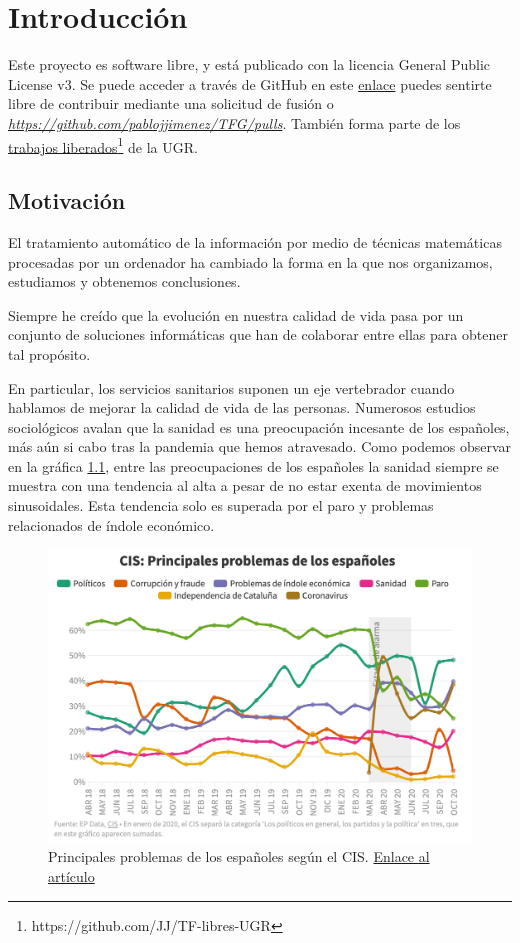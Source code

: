 \chapter{Introducción}
Este proyecto es software libre, y está publicado con la licencia \cite{gplv3} General Public License v3.
Se puede acceder a través de GitHub en este \href{https://github.com/pablojjimenez/TFG}{enlace} puedes sentirte libre de contribuir mediante una solicitud de fusión o \textit{\href{Pull Request}{https://github.com/pablojjimenez/TFG/pulls}}. También forma parte de los \href{https://github.com/JJ/TF-libres-UGR}{trabajos liberados}\footnote{https://github.com/JJ/TF-libres-UGR} de la UGR.

\section{Motivación} 
El tratamiento automático de la información por medio de técnicas matemáticas procesadas por un ordenador ha cambiado la forma en la que nos organizamos, estudiamos y obtenemos conclusiones.

Siempre he creído que la evolución en nuestra calidad de vida pasa por un
conjunto de soluciones informáticas que han de colaborar entre ellas para obtener tal propósito. 

En particular, los servicios sanitarios suponen un eje vertebrador cuando hablamos de mejorar la calidad de vida de las personas. Numerosos estudios sociológicos avalan que la sanidad es una preocupación incesante de los españoles, más aún si cabo tras la pandemia que hemos atravesado.
Como podemos observar en la gráfica \ref{fig:problemascis}, entre las preocupaciones de los españoles la sanidad siempre se muestra con una tendencia al alta a pesar de no estar exenta de movimientos sinusoidales. Esta tendencia solo es superada por el paro y problemas relacionados de índole económico.
\FloatBarrier
\begin{figure}[]
	\centering	
	\includegraphics[scale=0.5]{doc/logos/imgs/CIS_1.png}
	\caption{ 
        Principales problemas de los españoles según el CIS. \href{https://www.rtve.es/noticias/20201015/crisis-economica-coronavirus-preocupan-ahora-mas-espanoles-paro/2045610.shtml}{Enlace al artículo}
    }
    \label{fig:problemascis}
\end{figure}
\FloatBarrier

